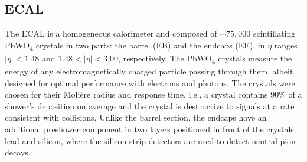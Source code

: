 \documentclass[12pt]{article}
\begin{document}
\subsection{ECAL}
The ECAL is a homogeneous calorimeter and composed of  ${\sim} 75,000$ scintillating PbWO\textsubscript{4} crystals in two parts: the barrel (EB) and the endcaps (EE), in $\eta$ ranges $|\eta| < 1.48$ and $1.48 < |\eta| < 3.00$, respectively. The PbWO\textsubscript{4} crystals measure the energy of any electromagnetically charged particle passing through them, albeit designed for optimal performance with electrons and photons. The crystals were chosen for their Moli\`ere radius and response time, i.e., a crystal contains 90\% of a shower's deposition on average and the crystal is destructive to signals at a rate consistent with collisions. Unlike the barrel section, the endcaps have an additional preshower component in two layers positioned in front of the crystals: lead and silicon, where the silicon strip detectors are used to detect neutral pion decays.\par


\end{document}
